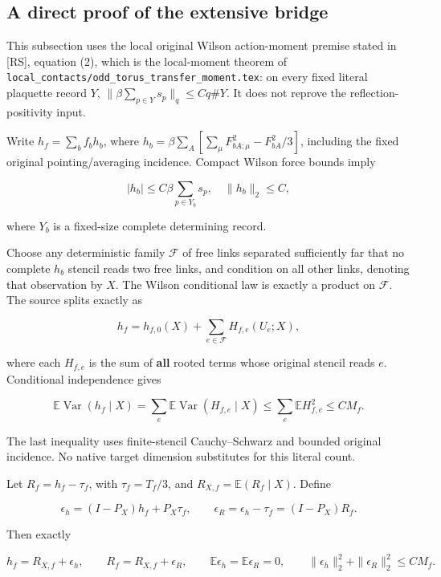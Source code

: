 \documentclass[
  11pt,
]{article}
\begin{document}
\hypertarget{independent-proof-of-the-extensive-bridge}{%
\subsection{A direct proof of the extensive
bridge}\label{independent-proof-of-the-extensive-bridge}}

This subsection uses the local original Wilson action-moment premise
stated in [RS], equation (2), which is the local-moment theorem of
\texttt{local\_contacts/odd\_torus\_transfer\_moment.tex}: on every fixed literal plaquette record \(Y\),
\(\|\beta\sum_{p\in Y}s_p\|_q\le Cq\#Y\). It does not reprove the
reflection-positivity input.

Write \(h_f=\sum_b f_bh_b\), where
\(h_b=\beta\sum_A[\sum_\mu F_{bA;\mu}^2-F_{bA}^2/3]\), including the
fixed original pointing/averaging incidence. Compact Wilson force bounds
imply

\[
 |h_b|\le C\beta\sum_{p\in Y_b}s_p,
 \quad \|h_b\|_2\le C, \tag{11}
\]

where \(Y_b\) is a fixed-size complete determining record.

Choose any deterministic family \(\mathcal F\) of free links separated
sufficiently far that no complete \(h_b\) stencil reads two free links,
and condition on all other links, denoting that observation by \(X\).
The Wilson conditional law is exactly a product on \(\mathcal F\). The
source splits exactly as

\[
 h_f=h_{f,0}(X)+\sum_{e\in\mathcal F}H_{f,e}(U_e;X),
\]

where each \(H_{f,e}\) is the sum of \textbf{all} rooted terms whose
original stencil reads \(e\). Conditional independence gives

\[
 \mathbb E\operatorname{Var}(h_f\mid X)
 =\sum_e\mathbb E\operatorname{Var}(H_{f,e}\mid X)
 \le\sum_e\mathbb EH_{f,e}^2
 \le C M_f. \tag{12}
\]

The last inequality uses finite-stencil Cauchy--Schwarz and bounded
original incidence. No native target dimension substitutes for this
literal count.

Let \(R_f=h_f-\tau_f\), with \(\tau_f=T_f/3\), and
\(R_{X,f}=\mathbb E(R_f\mid X)\). Define

\[
 \epsilon_h=(I-P_X)h_f+P_X\tau_f,
 \qquad \epsilon_R=\epsilon_h-\tau_f=(I-P_X)R_f.
\]

Then exactly

\[
 h_f=R_{X,f}+\epsilon_h,
 \qquad R_f=R_{X,f}+\epsilon_R,
 \qquad \mathbb E\epsilon_h=\mathbb E\epsilon_R=0,
 \qquad \|\epsilon_h\|_2^2+\|\epsilon_R\|_2^2\le C M_f. \tag{13}
\]
\end{document}
